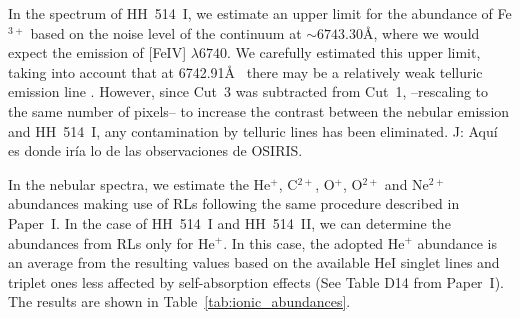 \documentclass[fleqn,usenatbib]{mnras}
\newcommand{\jorge}[1]{{\color{magenta}J: #1}}
\begin{document}
In the spectrum of HH~514~I, we estimate an upper limit for the abundance of Fe$^{3+}$ based on the noise level of the continuum at $\sim 6743.30$\AA, where we would expect the emission of [Fe\thinspace IV] $\lambda6740$. We carefully estimated this upper limit, taking into account that at 6742.91\AA~ there may be a relatively weak telluric emission line \citep[][]{Hanuschik03}. However, since Cut~3 was subtracted from Cut~1, --rescaling to the same number of pixels-- to increase the contrast between the nebular emission and HH~514~I, any contamination by telluric lines has been eliminated. \jorge{Aquí es donde iría lo de las observaciones de OSIRIS.}


In the nebular spectra, we estimate the He$^{+}$, C$^{2+}$, O$^{+}$, O$^{2+}$ and Ne$^{2+}$ abundances making use of RLs following the same procedure described in Paper~I. In the case of HH~514~I and HH~514~II, we can  determine the abundances from RLs only for He$^{+}$. In this case, the adopted He$^{+}$ abundance is an average from the resulting values based on the available He\thinspace I singlet lines and triplet ones less affected by self-absorption effects (See Table D14 from Paper~I). The results are shown in Table~\ref{tab:ionic_abundances}. 
\end{document}
